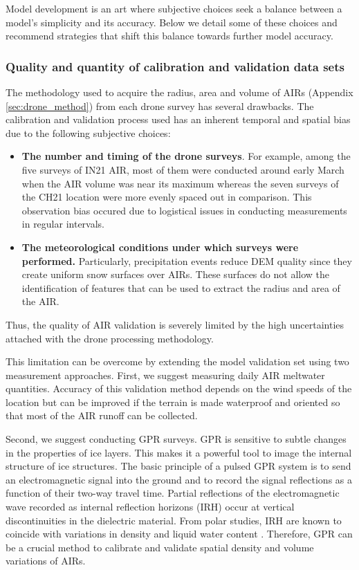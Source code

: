 Model development is an art where subjective choices seek a balance between a model's simplicity and its
accuracy. Below we detail some of these choices and recommend strategies that shift this balance towards further
model accuracy.

\subsubsection{Quality and quantity of calibration and validation data sets}

The methodology used to acquire the radius, area and volume of \ac{AIRs} (Appendix \ref{sec:drone_method}) from
each drone survey has several drawbacks. The calibration and validation process used has an inherent temporal
and spatial bias due to the following subjective choices:

\begin{itemize}
	\item \textbf{The number and timing of the drone surveys}. For example, among the five surveys of IN21 AIR, most of them were
	      conducted around early March when the AIR volume was near its maximum whereas the seven surveys of the CH21
	      location were more evenly spaced out in comparison. This observation bias occured due to logistical issues
	      in conducting measurements in regular intervals.

	\item \textbf{The meteorological conditions under which surveys were performed.} Particularly, precipitation events reduce DEM quality since
	      they create uniform snow surfaces over \ac{AIRs}. These surfaces do not allow the identification of features
	      that can be used to extract the radius and area of the AIR.

\end{itemize}

Thus, the quality of AIR validation is severely limited by the high uncertainties attached with the drone
processing methodology.

This limitation can be overcome by extending the model validation set using two measurement approaches. First,
we suggest measuring daily AIR meltwater quantities. Accuracy of this validation method depends on the wind
speeds of the location but can be improved if the terrain is made waterproof and oriented so that most of the
AIR runoff can be collected. 

Second, we suggest conducting \ac{GPR} surveys. \ac{GPR} is sensitive to subtle changes in the properties of ice
layers. This makes it a powerful tool to image the internal structure of ice structures. The basic principle of
a pulsed \ac{GPR} system is to send an electromagnetic signal into the ground and to record the signal
reflections as a function of their two-way travel time. Partial reflections of the electromagnetic wave recorded
as internal reflection horizons (IRH) occur at vertical discontinuities in the dielectric material. From polar
studies, IRH are known to coincide with variations in density and liquid water content
\citep{forster2014extensive}. Therefore, \ac{GPR} can be a crucial method to calibrate and validate spatial
density and volume variations of \ac{AIRs}.


